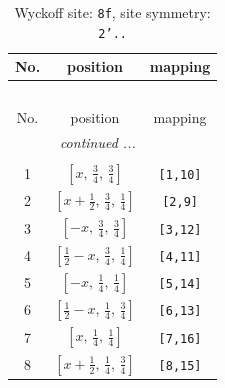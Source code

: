 \documentclass[fleqn,8pt]{jsarticle}
\begin{document}
\begin{longtable}{ccc}
\caption{Wyckoff site: {\tt 8f}, site symmetry: {\tt 2'..}}
 \\
 \hline \hline
No. & position & mapping \\ \hline \endfirsthead

\multicolumn{2}{l}{\tablename\ \thetable{}} \\
 \hline \hline
No. & position & mapping \\ \hline \endhead

 \hline \hline
\multicolumn{2}{r}{\footnotesize\it continued ...} \\ \endfoot

 \hline \hline
\multicolumn{2}{r}{} \\ \endlastfoot

1 & $\left[ x,\, \frac{3}{4},\, \frac{3}{4} \right]$ & {\tt [1,10]} \\ \hline
2 & $\left[ x + \frac{1}{2},\, \frac{3}{4},\, \frac{1}{4} \right]$ & {\tt [2,9]} \\ \hline
3 & $\left[ - x,\, \frac{3}{4},\, \frac{3}{4} \right]$ & {\tt [3,12]} \\ \hline
4 & $\left[ \frac{1}{2} - x,\, \frac{3}{4},\, \frac{1}{4} \right]$ & {\tt [4,11]} \\ \hline
5 & $\left[ - x,\, \frac{1}{4},\, \frac{1}{4} \right]$ & {\tt [5,14]} \\ \hline
6 & $\left[ \frac{1}{2} - x,\, \frac{1}{4},\, \frac{3}{4} \right]$ & {\tt [6,13]} \\ \hline
7 & $\left[ x,\, \frac{1}{4},\, \frac{1}{4} \right]$ & {\tt [7,16]} \\ \hline
8 & $\left[ x + \frac{1}{2},\, \frac{1}{4},\, \frac{3}{4} \right]$ & {\tt [8,15]} \\
\end{longtable}
\renewcommand{\arraystretch}{1.2}
\end{document}
